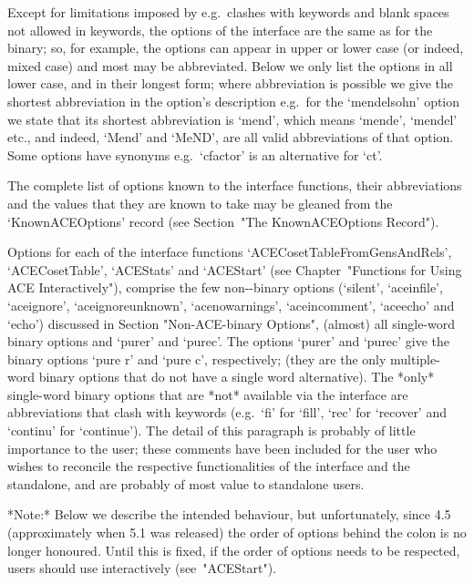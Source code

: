 Except for limitations imposed by {\GAP}  e.g.\  clashes  with  {\GAP}
keywords and blank spaces not allowed in keywords, the options of  the
{\ACE} interface are the same as for the binary; so, for example,  the
options can appear in upper or lower case (or indeed, mixed case)  and
most may be abbreviated. Below we only list the options in  all  lower
case, and in their longest form; where  abbreviation  is  possible  we
give the shortest abbreviation in the  option's  description  e.g.~for
the `mendelsohn' option we state that  its  shortest  abbreviation  is
`mend', which means `mende', `mendel' etc.,  and  indeed,  `Mend'  and
`MeND', are all valid abbreviations of that option. Some options  have
synonyms e.g.~`cfactor' is an alternative for `ct'.

The complete list of {\ACE} options  known  to  the  {\ACE}  interface
functions, their abbreviations and the values that they are  known  to
take  may  be  gleaned  from   the   `KnownACEOptions'   record   (see
Section~"The KnownACEOptions Record").

Options  for each of  the       {\ACE}       interface       functions
`ACECosetTableFromGensAndRels',   `ACECosetTable',   `ACEStats'    and
`ACEStart' (see  Chapter~"Functions  for  Using  ACE  Interactively"),
comprise the few  non-{\ACE}-binary  options  (`silent',  `aceinfile',
`aceignore',   `aceignoreunknown',    `acenowarnings',
`aceincomment',     `aceecho'     and     `echo')     discussed     in
Section "Non-ACE-binary  Options",  (almost)  all  single-word  {\ACE}
binary options and  `purer'  and  `purec'.  The  options  `purer'  and
`purec' give  the  {\ACE}  binary  options  `pure  r'  and  `pure  c',
respectively; (they are the only multiple-word {\ACE}  binary  options
that do not have a single word alternative).  The  *only*  single-word
{\ACE}  binary  options  that  are  *not*  available  via  the  {\ACE}
interface are abbreviations that clash with {\GAP} keywords (e.g.~`fi'
for `fill', `rec' for `recover' and  `continu'  for  `continue').  The
detail of this paragraph is  probably  of  little  importance  to  the
{\GAP} user; these comments have been included for the user who wishes
to reconcile the respective functionalities of  the  {\ACE}  interface
and  the  {\ACE}  standalone,  and  are  probably  of  most  value  to
standalone users.


*Note:* Below we describe the intended behaviour,  but  unfortunately,
since {\GAP} 4.5  (approximately  when  {\ACE} 5.1  was  released) the
order of options  behind  the colon  is no longer honoured. Until this
is fixed, if the order of {\ACE} options needs to be respected,  users
should use {\ACE} interactively (see~"ACEStart").

